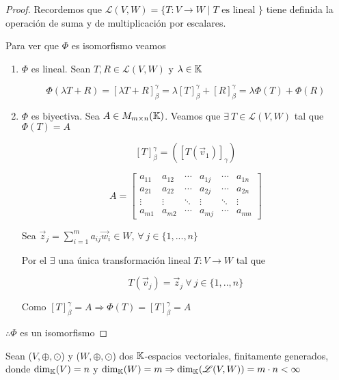 \begin{proof}
    Recordemos que $\mathcal{L}(V,W) = \{ T : V \to W \mid T \text{ es lineal } \}$ tiene definida la operación de suma y de multiplicación por escalares. 

    Para ver que $\Phi$ es isomorfismo veamos

    \begin{enumerate}
        \item $\Phi$ es lineal. Sean $T, R \in \mathcal{L}(V,W)$ y $\lambda \in \mathbb{K}$

        $$\Phi(\lambda T+R) = {[\lambda T+R]}_{\beta}^{\gamma} = \lambda {[T]}_{\beta}^{\gamma} + {[R]}_{\beta}^{\gamma} = \lambda \Phi(T)+ \Phi(R)$$

        \item $\Phi$ es biyectiva. Sea $A \in M_{m \times n} (\mathbb{K})$. Veamos que $\exists \: T \in \mathcal{L}(V,W)$ tal que $\Phi(T) = A$
        
        $$ {[T]}_{\beta}^{\gamma} = \left(  {[T(\vec{v}_{1})]}_{\gamma}  \right)$$

        $$A = \begin{bmatrix}
    {a}_{11} & {a}_{12} & \cdots & {a}_{1j} & \cdots & {a}_{1n} \\[1ex]
    {a}_{21} & {a}_{22} & \cdots & {a}_{2j} & \cdots & {a}_{2n} \\[1ex]
    \vdots & \vdots & \ddots & \vdots & \ddots & \vdots \\[1ex]
    {a}_{m1} & {a}_{m2} & \cdots & {a}_{mj} & \cdots & {a}_{mn}
    \end{bmatrix}$$

    Sea ${\vec{z}}_{j} = \sum_{i=1}^{m} a_{ij}{\vec{w}}_{i} \in W$, $\forall \: j \in \{1, ..., n \}$

    Por el  $\exists$ una única transformación lineal $T : V \to W$ tal que

    $$T(\vec{v}_{j}) = \vec{z}_{j} \: \forall \: j \in \{ 1, .., n \}$$

    Como ${[T]}_{\beta}^{\gamma} = A \Rightarrow \Phi(T) = {[T]}_{\beta}^{\gamma} = A $
    \end{enumerate}
    $\therefore \Phi$ es un isomorfismo
\end{proof}

\begin{corollary}
    Sean ($V, \oplus, \odot$) y ($W, \oplus, \odot$) dos $\mathbb{K}$-espacios vectoriales, finitamente generados, donde $\dim_{\mathbb{K}}(V)=n$ y $\dim_{\mathbb{K}}(W)=m \Rightarrow \dim_{\mathbb{K}}(\mathscr{L}(V,W))=m\cdot n < \infty$
\end{corollary}

